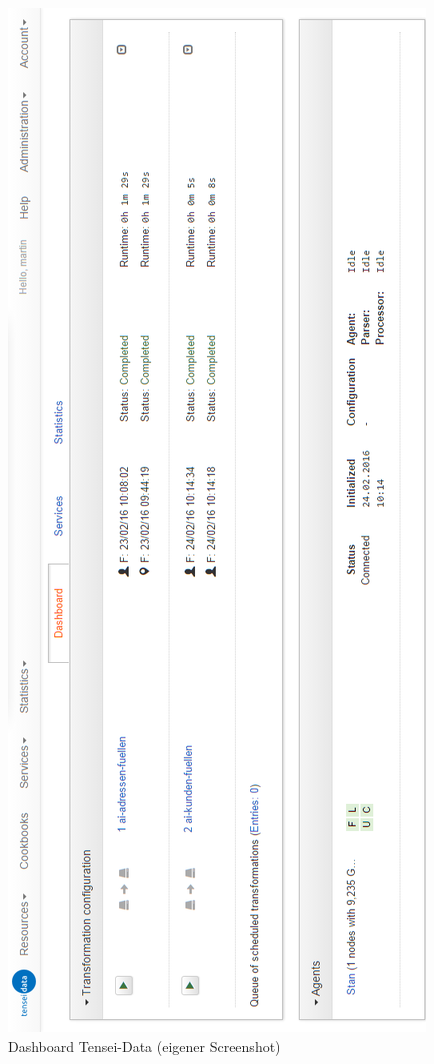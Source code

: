 \begin{figure}[ht]
	\begin{center}
		\includegraphics[scale=0.5]{bilder/dashboard.png}
		\caption{Dashboard Tensei-Data (eigener Screenshot)}
		\label{pic:Dash:Tensei}
	\end{center}
\end{figure}

